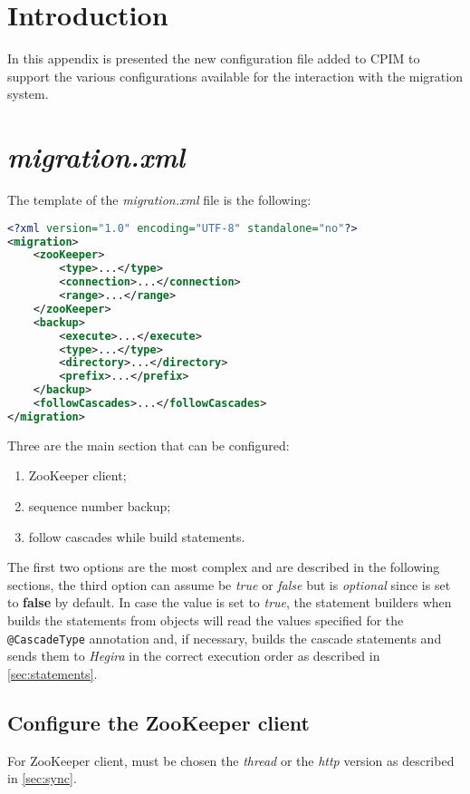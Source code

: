 \section{Introduction}
In this appendix is presented the new configuration file added to CPIM to support the various configurations available for the interaction with the migration system.

\section{\textit{migration.xml}}
The template of the \textit{migration.xml} file is the following:

\begin{lstlisting}[language=XML, caption=migration.xml template]
<?xml version="1.0" encoding="UTF-8" standalone="no"?>
<migration>
    <zooKeeper>
        <type>...</type>
        <connection>...</connection>
        <range>...</range>
    </zooKeeper>
    <backup>
        <execute>...</execute>
        <type>...</type>
        <directory>...</directory>
        <prefix>...</prefix>
    </backup>
    <followCascades>...</followCascades>
</migration>
\end{lstlisting}

\newparagraph Three are the main section that can be configured:
\begin{enumerate}
\item ZooKeeper client;
\item sequence number backup;
\item follow cascades while build statements.
\end{enumerate}

\noindent The first two options are the most complex and are described in the following sections, the third option can assume be \textit{true} or \textit{false} but is \textit{optional} since is set to \textbf{false} by default.
In case the value is set to \textit{true}, the statement builders when builds the statements from objects will read the values specified for the \texttt{@CascadeType} annotation and, if necessary, builds the cascade statements and sends them to \textit{Hegira} in the correct execution order as described in \ref{sec:statements}.

\subsection{Configure the ZooKeeper client}
For ZooKeeper client, must be chosen the \textit{thread} or the \textit{http} version as described in \ref{sec:sync}.


